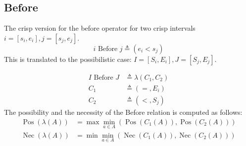 \documentclass{llncs}
\newcommand{\Pos}{\operatorname{Pos}}
\newcommand{\Nec}{\operatorname{Nec}}
\begin{document}
\subsection{\label{subsec:before}Before}
The crisp version for the before operator for two crisp intervals $i = \left[s_i,e_i \right], j = \left[s_j, e_j \right]$.
\begin{equation}
i \mbox{ Before } j \triangleq \left( e_i < s_j \right)
\end{equation}
This is translated to the possibilistic case:
$I = \left[S_i, E_i \right], J = \left[S_j, E_j\right]$.

\begin{align}
 I \mbox{ Before } J &\triangleq \lambda \left(C_1, C_2 \right)\\
\nonumber
C_1 &\triangleq \left(=, E_i\right) \\
\nonumber
C_2 &\triangleq \left(<, S_j \right)
\end{align}
The possibility and the necessity of the Before relation is computed as follows:
\begin{align}
\Pos \left(\lambda \left(A \right)\right) &= \max \min_{a \in A} \left(\Pos \left(C_1 \left( A\right) \right), \Pos \left(C_2\left(A \right) \right) \right)\\
\nonumber
\Nec \left(\lambda \left(A\right)\right) &= \min \min_{a \in A} \left(\Nec \left(C_1 \left( A\right) \right), \Nec \left(C_2\left(A \right) \right) \right)
\end{align}
\end{document}
